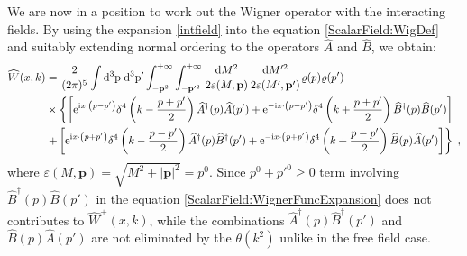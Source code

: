 \documentclass[prd,superscriptaddress,nofootinbib,notitlepage]{revtex4-1}
\def\wA{{\widehat A}}
\def\wB{{\widehat B}}
\def\wA{\widehat A}
\def\wAd{\widehat A^{\dagger}}
\def\wB{\widehat B}
\def\wBd{\widehat B^{\dagger}}
\def\wW{\widehat W}
\newcommand{\e}{{\rm e}}
\newcommand{\pp}{{\rm p}}
\newcommand{\di}{{\rm d}}
\newcommand{\ii}{{\rm i}}
\newcommand{\p}{{\mathbf{p}}}
\begin{document}
We are now in a position to work out the Wigner operator with the interacting fields. By using the expansion
\eqref{intfield} into the equation \eqref{ScalarField:WigDef} and suitably extending normal ordering to the operators 
$\wA$ and $\wB$, we obtain:
%
\begin{equation}\label{ScalarField:WignerFuncExpansion}
\begin{split}
\wW(x,k)&= \frac{2}{(2\pi)^5} \int\di^3\pp\;\di^3\pp'\int ^{+\infty}_{-{\bf p}^2}
\int^{+\infty}_{-{\bf p}'^2}\frac{\di M^2}{2\varepsilon(M,\p)}\frac{\di M'^2}{2\varepsilon(M',\p')}
\varrho(p)\varrho(p')\\
&\times \left\{ \left[\e^{\ii x\cdot\left(p-p'\right)}
\delta^4\left(k-\frac{p+p'}{2}\right)\wAd(p)\wA(p')+ \e^{-\ii x\cdot\left(p-p'\right)}
\delta^4\left(k+\frac{p+p'}{2}\right) \wBd(p)\wB(p')\right]\right.\\
&\left.+ \left[\e^{\ii x\cdot\left(p+p'\right)} \delta^4\left(k-\frac{p-p'}{2}\right)
\wAd(p)\wBd(p')+\e^{-\ii x\cdot\left(p+p'\right)} \delta^4\left(k+\frac{p-p'}{2}\right)
\wB(p)\wA(p')\right]\right\}\;,
\end{split}
\end{equation}
%
where $\varepsilon(M,\p)=\sqrt{M^2+|\p|^2}=p^0$. Since $p^0+p'^0 \ge 0$ term involving $\wBd(p)\wB(p')$ in the 
equation \eqref{ScalarField:WignerFuncExpansion} does not contributes to $\wW^+(x,k)$, while the combinations 
$\wAd(p)\wBd(p')$ and $\wB(p)\wA(p')$ are not eliminated by the $\theta(k^2)$ unlike in the free field case.
\end{document}
